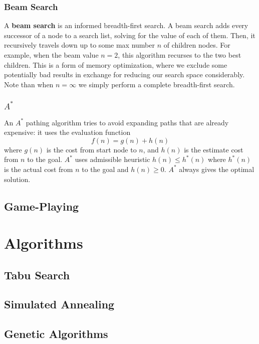 \documentclass[12pt]{article}
\begin{document}
\subsubsection{Beam Search}
A {\bf beam search} is an informed breadth-first search. A beam search adds every successor of a node to a search list, solving for the value of each of them. Then, it recursively travels down up to some max number $n$ of children nodes. For example, when the beam value $n = 2$, this algorithm recurses to the two best children. This is a form of memory optimization, where we exclude some potentially bad results in exchange for reducing our search space considerably. Note than when $n = \infty$ we simply perform a complete breadth-first search.

\subsubsection{$A^*$}
An {\bf $A^*$} pathing algorithm tries to avoid expanding paths that are already expensive: it uses the evaluation function \[ f(n) = g(n) + h(n) \] where $g(n)$ is the cost from start node to $n$, and $h(n)$ is the estimate cost from $n$ to the goal. $A^*$ uses admissible heuristic $h(n) \leq h^*(n)$ where $h^*(n)$ is the actual cost from $n$ to the goal and $h(n) \geq 0$. $A^*$ always gives the optimal solution.

\subsection{Game-Playing}

\section{Algorithms}
\subsection{Tabu Search}

\subsection{Simulated Annealing}

\subsection{Genetic Algorithms}
\end{document}
